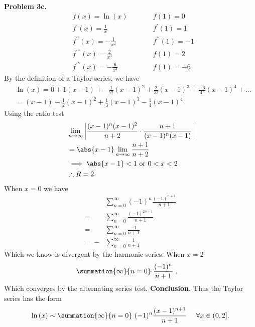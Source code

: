 \documentclass{report}
\begin{document}
    \bigbreak \noindent 
    \textbf{Problem 3c.}
    \begin{equation}
    \begin{alignedat}{2}
        &f(x) =\ln{(x)}  \quad \quad &&f(1) = 0 \\
        &f^{\prime}(x) = \frac{1}{x} \quad \quad &&f^{\prime}(1) = 1 \\
        &f^{\prime\prime}(x) = -\frac{1}{x^{2}} \quad \quad &&f^{\prime\prime}(1) = -1 \\
        &f^{\prime\prime\prime}(x) = \frac{2}{x^{3}} \quad \quad &&f(1) = 2 \\
        &f^{\prime\prime\prime}(x) = -\frac{6}{x^{4}} \quad \quad &&f(1) = -6
    \end{alignedat}
    \end{equation}
    \bigbreak \noindent
    By the definition of a Taylor series, we have
    \begin{align*}
       &\ln{(x)} = 0 + 1(x-1) + -\frac{1}{2!}(x-1)^{2} + \frac{2}{3!}(x-1)^{3} + \frac{-6}{4!}(x-1)^{4} + ... \\
       &= (x-1)-\frac{1}{2}(x-1)^{2}+\frac{1}{3}(x-1)^{3}-\frac{1}{4}(x-1)^{4}
    .\end{align*}
    \bigbreak \noindent 
    Using the ratio test
    \begin{align*}
        &\lim\limits_{n \to \infty}{\bigg\lvert \frac{(x-1)^{n}(x-1)^{2}}{n+2} \cdot \frac{n+1}{(x-1)^{n}(x-1)} \bigg\rvert} \\
        &=\abs{x-1}\lim\limits_{n \to \infty}{\frac{n+1}{n+2}} \\
        &\implies \abs{x-1} < 1 \text{ or } 0 < x < 2\\
        &\therefore R=2
    .\end{align*}
    When $x=0$ we have
    \begin{align*}
        &\sum_{n=0}^{\infty} (-1)^{n}\frac{(-1)^{n+1}}{n+1} \\
        =&\sum_{n=0}^{\infty} \frac{(-1)^{2n+1}}{n+1} \\
        =&\sum_{n=0}^{\infty} \frac{-1}{n+1} \\
        =-&\sum_{n=0}^{\infty} \frac{1}{n+1} 
    \end{align*}
    Which we know is divergent by the harmonic series. When $x=2$
    \begin{align*}
        &\summation{\infty}{n=0}\ \frac{(-1)^{n}}{n+1} \
    .\end{align*}
    Which converges by the alternating series test.
    \bigbreak \noindent 
    \textbf{Conclusion.} Thus the Taylor series has the form
    \begin{align*}
        \ln{(x)} \sim \summation{\infty}{n=0}\ (-1)^{n}\frac{(x-1)^{n+1}}{n+1}\ \quad \forall x\in (0,2]
    .\end{align*}
\end{document}
